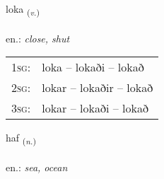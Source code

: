 \documentclass[frontgrid, backgrid]{flacards}\usepackage[]{graphicx}\usepackage[]{xcolor}
\begin{document}
\renewcommand{\flhead}{\vskip5pt \fboxsep=0pt {\small\bfseries\footnotesize Sagnorð | Verb}}
\renewcommand{\fcfoot}{\vskip5pt \fboxsep=0pt \hspace{2pt}{\small\bfseries\footnotesize 1K}}

\renewcommand{\blhead}{\vskip5pt {\small\bfseries\footnotesize Sagnorð | Verb }}
\renewcommand{\bcfoot}{\vskip5pt \hspace{2pt}{\small\bfseries\footnotesize 1K}}


{loka \small{\textsubscript{(\textit{v.})}} \\[1ex] %
\textphonetic{[lɔːka]} \\
en.: \emph{close, shut} \\  [2ex]
\renewcommand*{\arraystretch}{0.8}
\begin{tabular}{p{1cm}l}
\textsc{1sg}: & loka -- lokaði -- lokað \\ 
\textsc{2sg}: & lokar -- lokaðir -- lokað \\ 
\textsc{3sg}: & lokar -- lokaði -- lokað \\ 
\end{tabular}
}

\renewcommand{\flhead}{\vskip5pt \fboxsep=0pt {\small\bfseries\footnotesize Nafnorð | Noun}}
\renewcommand{\fcfoot}{\vskip5pt \fboxsep=0pt \hspace{2pt}{\small\bfseries\footnotesize 1K}}

\renewcommand{\blhead}{\vskip5pt {\small\bfseries\footnotesize Nafnorð | Noun }}
\renewcommand{\bcfoot}{\vskip5pt \hspace{2pt}{\small\bfseries\footnotesize 1K}}


{haf \small{\textsubscript{(\textit{n.})}} \\[1ex] %
\textphonetic{[haːv]} \\
en.: \emph{sea, ocean} \\  [2ex]
\renewcommand*{\arraystretch}{0.8}
}
\end{document}
